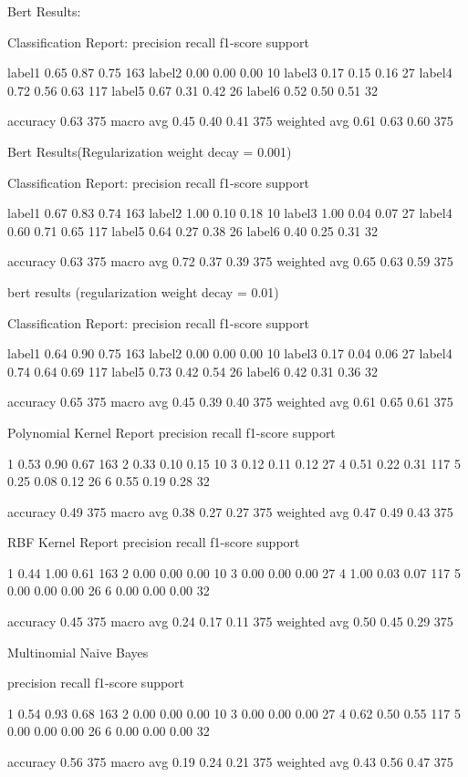 Bert Results:

Classification Report: precision recall f1-score support

label1 0.65 0.87 0.75 163 label2 0.00 0.00 0.00 10 label3 0.17 0.15 0.16
27 label4 0.72 0.56 0.63 117 label5 0.67 0.31 0.42 26 label6 0.52 0.50
0.51 32

accuracy 0.63 375 macro avg 0.45 0.40 0.41 375 weighted avg 0.61 0.63
0.60 375

Bert Results(Regularization weight decay = 0.001)

Classification Report: precision recall f1-score support

label1 0.67 0.83 0.74 163 label2 1.00 0.10 0.18 10 label3 1.00 0.04 0.07
27 label4 0.60 0.71 0.65 117 label5 0.64 0.27 0.38 26 label6 0.40 0.25
0.31 32

accuracy 0.63 375 macro avg 0.72 0.37 0.39 375 weighted avg 0.65 0.63
0.59 375

bert results (regularization weight decay = 0.01)

Classification Report: precision recall f1-score support

label1 0.64 0.90 0.75 163 label2 0.00 0.00 0.00 10 label3 0.17 0.04 0.06
27 label4 0.74 0.64 0.69 117 label5 0.73 0.42 0.54 26 label6 0.42 0.31
0.36 32

accuracy 0.65 375 macro avg 0.45 0.39 0.40 375 weighted avg 0.61 0.65
0.61 375

Polynomial Kernel Report precision recall f1-score support

1 0.53 0.90 0.67 163 2 0.33 0.10 0.15 10 3 0.12 0.11 0.12 27 4 0.51 0.22
0.31 117 5 0.25 0.08 0.12 26 6 0.55 0.19 0.28 32

accuracy 0.49 375 macro avg 0.38 0.27 0.27 375 weighted avg 0.47 0.49
0.43 375

RBF Kernel Report precision recall f1-score support

1 0.44 1.00 0.61 163 2 0.00 0.00 0.00 10 3 0.00 0.00 0.00 27 4 1.00 0.03
0.07 117 5 0.00 0.00 0.00 26 6 0.00 0.00 0.00 32

accuracy 0.45 375 macro avg 0.24 0.17 0.11 375 weighted avg 0.50 0.45
0.29 375

Multinomial Naive Bayes

precision recall f1-score support

1 0.54 0.93 0.68 163 2 0.00 0.00 0.00 10 3 0.00 0.00 0.00 27 4 0.62 0.50
0.55 117 5 0.00 0.00 0.00 26 6 0.00 0.00 0.00 32

accuracy 0.56 375 macro avg 0.19 0.24 0.21 375 weighted avg 0.43 0.56
0.47 375
